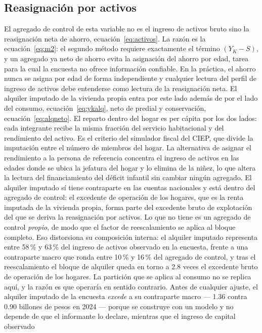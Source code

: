 \documentclass[11pt,a4paper]{article}
\begin{document}
\subsection{Reasignación por activos}
El agregado de control de esta variable no es el ingreso de activos bruto sino la reasignación
neta de ahorro, ecuación~\eqref{eq:activos}. La razón es la ecuación~\eqref{eq:m2}: el segundo
método requiere exactamente el término $(Y_K - S)$, y un agregado ya neto de ahorro evita la
asignación del ahorro por edad, tarea para la cual la encuesta no ofrece información confiable.
En la práctica, el ahorro nunca se asigna por edad de forma independiente y cualquier lectura del
perfil de ingreso de activos debe entenderse como lectura de la reasignación neta. El alquiler
imputado de la vivienda propia entra por este lado además de por el lado del consumo,
ecuación~\eqref{eq:ykalq}, neto de predial y conservación, ecuación~\eqref{eq:alqneto}. El
reparto dentro del hogar es per cápita por los dos lados: cada integrante recibe la misma fracción
del servicio habitacional y del rendimiento del activo. Es el criterio del simulador fiscal del
CIEP, que divide la imputación entre el número de miembros del hogar. La alternativa de asignar
el rendimiento a la persona de referencia concentra el ingreso de activos en las edades donde se
ubica la jefatura del hogar y lo elimina de la niñez, lo que altera la lectura del financiamiento
del déficit infantil sin cambiar ningún agregado.
El alquiler imputado sí tiene contraparte en las cuentas nacionales y está dentro del agregado de
control: el excedente de operación de los hogares, que es la renta imputada de la vivienda propia,
forma parte del excedente bruto de explotación del que se deriva la reasignación por activos. Lo
que no tiene es un agregado de control \emph{propio}, de modo que el factor de reescalamiento se
aplica al bloque completo. Eso distorsiona su composición interna: el alquiler imputado representa
entre 58\,\% y 63\,\% del ingreso de activos observado en la encuesta, frente a una contraparte
macro que ronda entre 10\,\% y 16\,\% del agregado de control, y tras el reescalamiento el bloque
de alquiler queda en torno a 2.8 veces el excedente bruto de operación de los hogares.
La partición que se aplica al consumo no se replica aquí, y la razón es que operaría en sentido
contrario. Antes de cualquier ajuste, el alquiler imputado de la encuesta \emph{excede} a su
contraparte macro --- 1.36 contra 0.90 billones de pesos en 2024 --- porque se construye con un
modelo y no depende de que el informante lo declare, mientras que el ingreso de capital observado
\end{document}
